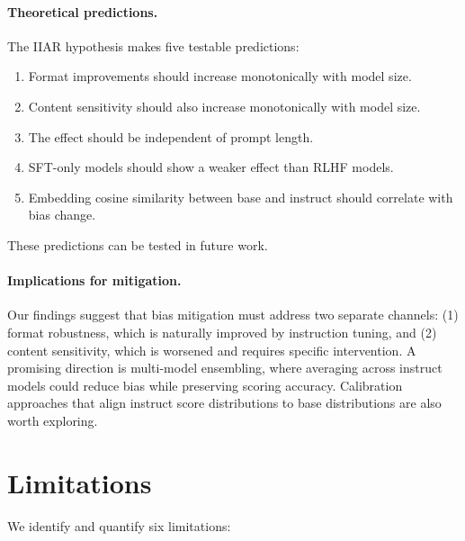 \documentclass[11pt,twocolumn]{article}
\begin{document}
\paragraph{Theoretical predictions.}
The IIAR hypothesis makes five testable predictions:
\begin{enumerate}
    \item Format improvements should increase monotonically with model size.
    \item Content sensitivity should also increase monotonically with model size.
    \item The effect should be independent of prompt length.
    \item SFT-only models should show a weaker effect than RLHF models.
    \item Embedding cosine similarity between base and instruct should correlate with bias change.
\end{enumerate}
These predictions can be tested in future work.

\paragraph{Implications for mitigation.}
Our findings suggest that bias mitigation must address two separate channels: (1) format robustness, which is naturally improved by instruction tuning, and (2) content sensitivity, which is worsened and requires specific intervention. A promising direction is multi-model ensembling, where averaging across instruct models could reduce bias while preserving scoring accuracy. Calibration approaches that align instruct score distributions to base distributions are also worth exploring.

\section{Limitations}

We identify and quantify six limitations:
\end{document}

